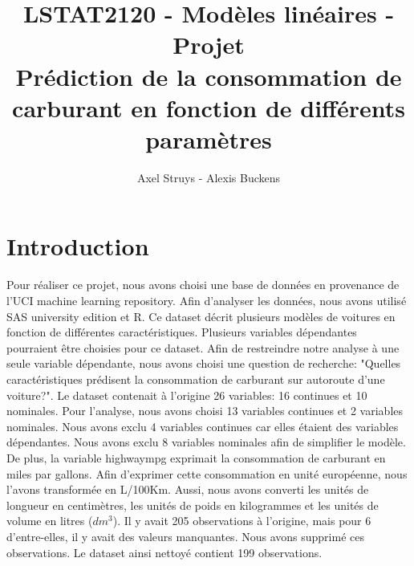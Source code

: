 \documentclass[11pt,a4paper]{article}
\author{Axel Struys - Alexis Buckens}
\title{LSTAT2120 - Modèles linéaires - Projet\\ Prédiction de la consommation de carburant en fonction de différents paramètres }
\begin{document}
\maketitle
\section{Introduction}
Pour réaliser ce projet, nous avons choisi une base de données en provenance de l'UCI machine learning repository. Afin d'analyser les données, nous avons utilisé SAS university edition et R.
Ce dataset décrit plusieurs modèles de voitures en fonction de différentes caractéristiques. Plusieurs variables dépendantes pourraient être choisies pour ce dataset. Afin de restreindre notre analyse à une seule variable dépendante, nous avons choisi une question de recherche: "Quelles caractéristiques prédisent la consommation de carburant sur autoroute d'une voiture?".
Le dataset contenait à l'origine 26 variables: 16 continues et 10 nominales. Pour l'analyse, nous avons choisi 13 variables continues et 2 variables nominales. Nous avons exclu 4 variables continues car elles étaient des variables dépendantes. Nous avons exclu 8 variables nominales afin de simplifier le modèle. De plus, la variable highwaympg exprimait la consommation de carburant en miles par gallons. Afin d'exprimer cette consommation en unité européenne, nous l'avons transformée en L/100Km. Aussi, nous avons converti les unités de longueur en centimètres, les unités de poids en kilogrammes et les unités de volume en litres ($dm^{3}$).
Il y avait 205 observations à l'origine, mais pour 6 d'entre-elles, il y avait des valeurs manquantes. Nous avons supprimé ces observations. Le dataset ainsi nettoyé contient 199 observations.
\end{document}
